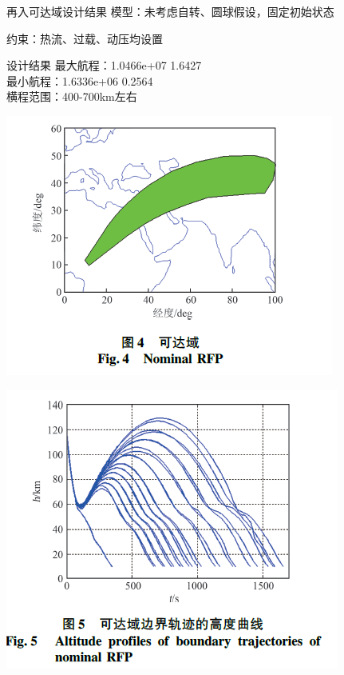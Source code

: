 \documentclass[11pt]{ctexbeamer}
\begin{document}
\begin{frame}{再入可达域设计结果}
	模型：未考虑自转、圆球假设，固定初始状态

	约束：热流、过载、动压均设置
	\begin{block}{设计结果}
		最大航程：1.0466e+07    1.6427\\
		最小航程：1.6336e+06    0.2564\\
		横程范围：400-700km左右\\
		\begin{minipage}{0.4\linewidth}
			\centering
			\includegraphics[height=.4\textheight]{nominal_RFP.png}
		\end{minipage}
		\hspace{1cm}
		\begin{minipage}{0.4\linewidth}
			\centering
			\includegraphics[height=.4\textheight]{RFP_altitude_profile.png}
		\end{minipage}
	\end{block}
\end{frame}
\end{document}
